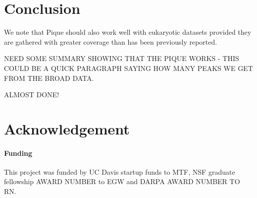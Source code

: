 \documentclass{bioinfo} %
\begin{document}
\section{Conclusion}

We note that Pique should also work well with eukaryotic datasets
provided they are gathered with greater coverage than has been
previously reported.

NEED SOME SUMMARY SHOWING THAT THE PIQUE WORKS - THIS COULD BE A QUICK
PARAGRAPH SAYING HOW MANY PEAKS WE GET FROM THE BROAD DATA.

ALMOST DONE!

\section*{Acknowledgement} \paragraph{Funding\textcolon}

This project was funded by UC Davis startup funds to MTF, NSF graduate
fellowship AWARD NUMBER to EGW and DARPA AWARD NUMBER TO RN.

%




\end{document}
